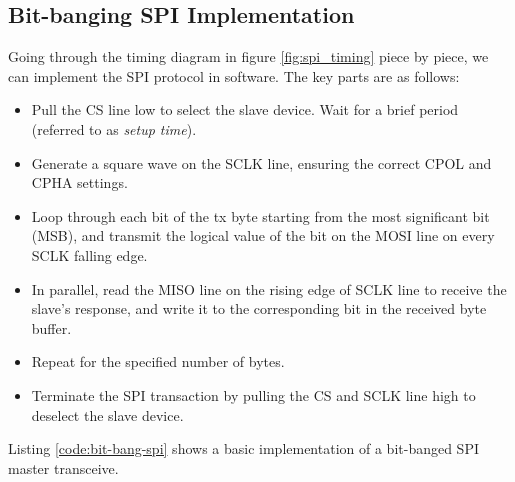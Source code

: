 \documentclass[main.tex]{subfiles}
\begin{document}
\subsection{Bit-banging SPI Implementation}
Going through the timing diagram in figure \ref{fig:spi_timing} piece by piece, we can implement the SPI protocol in software. The key parts are as follows:
\begin{itemize}
    \item Pull the CS line low to select the slave device. Wait for a brief period (referred to as \textit{setup time}).
    \item Generate a square wave on the SCLK line, ensuring the correct CPOL and CPHA settings.
    \item Loop through each bit of the tx byte starting from the most significant bit (MSB), and transmit the logical value of the bit on the MOSI line on every SCLK falling edge.
    \item In parallel, read the MISO line on the rising edge of SCLK line to receive the slave's response, and write it to the corresponding bit in the received byte buffer. 
    \item Repeat for the specified number of bytes.
    \item Terminate the SPI transaction by pulling the CS and SCLK line high to deselect the slave device.
\end{itemize}

\noindent Listing \ref{code:bit-bang-spi} shows a basic implementation of a bit-banged SPI master transceive.



\end{document}
